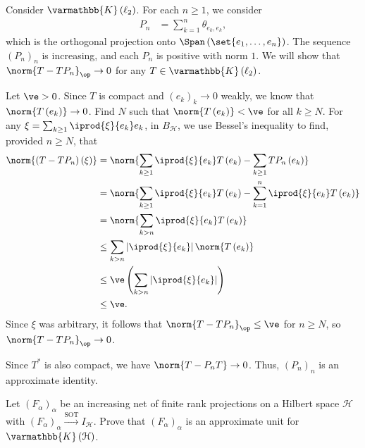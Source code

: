 \documentclass[10pt]{mypackage}
\renewcommand*{\mathbb}[1]{\varmathbb{#1}}
\newcommand{\K}{\mathbb{K}}
\begin{document}
\begin{example}
  Consider $\K\left(\ell_2\right)$. For each $n\geq 1$, we consider
  \begin{align*}
    P_n &= \sum_{k = 1}^{n}\theta_{e_k,e_k},
  \end{align*}
  which is the orthogonal projection onto $\Span\left(\set{e_1,\dots,e_n}\right)$. The sequence $\left(P_n\right)_n$ is increasing, and each $P_n$ is positive with norm $1$. We will show that $\norm{T-TP_n}_{\op} \rightarrow 0$ for any $T\in \K\left(\ell_2\right)$.\newline

  Let $\ve > 0$. Since $T$ is compact and $\left(e_k\right)_k\rightarrow 0$ weakly, we know that $\norm{T\left(e_k\right)}\rightarrow 0$. Find $N$ such that $\norm{T\left(e_k\right)} < \ve$ for all $k\geq N$. For any $\xi = \sum_{k\geq 1} \iprod{\xi}{e_k}e_k$, in $B_{\mathcal{H}}$, we use Bessel's inequality to find, provided $n\geq N$, that
  \begin{align*}
    \norm{\left(T - TP_n\right)\left(\xi\right)} &= \norm{\sum_{k\geq 1} \iprod{\xi}{e_k}T\left(e_k\right) - \sum_{k\geq 1}TP_n\left(e_k\right)}\\
                                                 &= \norm{\sum_{k\geq 1} \iprod{\xi}{e_k}T\left(e_k\right) - \sum_{k=1}^{n} \iprod{\xi}{e_k}T\left(e_k\right)}\\
                                                 &= \norm{\sum_{k > n} \iprod{\xi}{e_k}T\left(e_k\right)}\\
                                                 &\leq \sum_{k > n} \left\vert \iprod{\xi}{e_k} \right\vert\norm{T\left(e_k\right)}\\
                                                 &\leq \ve \left(\sum_{k > n} \left\vert \iprod{\xi}{e_k} \right\vert\right)\\
                                                 &\leq \ve.
  \end{align*}
  Since $\xi$ was arbitrary, it follows that $\norm{T - TP_n}_{\op} \leq \ve$ for $n\geq N$, so $\norm{T-TP_n}_{\op} \rightarrow 0$.\newline

  Since $T^{\ast}$ is also compact, we have $\norm{T - P_nT}\rightarrow 0$. Thus, $\left(P_n\right)_n$ is an approximate identity.
\end{example}
\begin{exercise}
  Let $\left(F_{\alpha}\right)_{\alpha}$ be an increasing net of finite rank projections on a Hilbert space $\mathcal{H}$ with $\left(F_{\alpha}\right)_{\alpha}\xrightarrow{\text{SOT}}I_{\mathcal{H}}$. Prove that $\left(F_{\alpha}\right)_{\alpha}$ is an approximate unit for $\K\left(\mathcal{H}\right)$.
\end{exercise}
\end{document}
